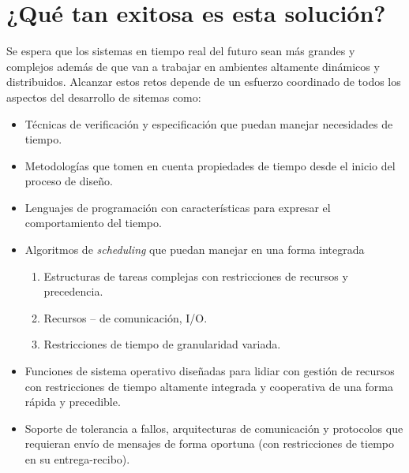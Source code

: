 \section{¿Qué tan exitosa es esta solución?} 
Se espera que los sistemas en tiempo real del futuro sean más grandes y complejos además de que van a trabajar en ambientes altamente dinámicos y distribuidos. Alcanzar estos retos depende de un esfuerzo coordinado de todos los aspectos del desarrollo de sitemas como:
\begin{itemize}
    \item Técnicas de verificación y especificación que puedan manejar necesidades de tiempo.
    \item Metodologías que tomen en cuenta propiedades de tiempo desde el inicio del proceso de diseño.
    \item Lenguajes de programación con características para expresar el comportamiento del tiempo.
    \item Algoritmos de \emph{scheduling} que puedan manejar en una forma integrada
    \begin{enumerate}
        \item Estructuras de tareas complejas con restricciones de recursos y precedencia.
        \item Recursos -- de comunicación, I/O.
        \item Restricciones de tiempo de granularidad variada.
    \end{enumerate}
    \item Funciones de sistema operativo diseñadas para lidiar con gestión de recursos con restricciones de tiempo altamente integrada y cooperativa de una forma rápida y precedible.
    \item Soporte de tolerancia a fallos, arquitecturas de comunicación y protocolos que requieran envío de mensajes de forma oportuna (con restricciones de tiempo en su entrega-recibo).
\end{itemize}

